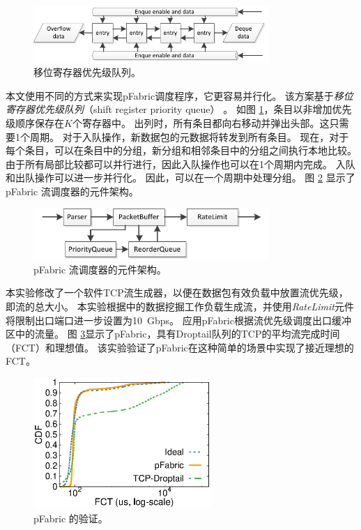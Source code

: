 \begin{figure}[htbp]
	\centering
	\includegraphics[width=0.8\textwidth]{image/PriorityQueue}
	\caption{移位寄存器优先级队列。}
	\label{clicknp:fig:ShiftRegPrioQueue}
\end{figure}


本文使用不同的方式来实现pFabric调度程序，它更容易并行化。
该方案基于\textit{移位寄存器优先级队列}（shift register priority queue） \cite {moon2000scalable}。
如图 \ref{clicknp:fig:ShiftRegPrioQueue}，条目以非增加优先级顺序保存在$K$个寄存器中。
出列时，所有条目都向右移动并弹出头部。这只需要1个周期。
对于入队操作，新数据包的元数据将转发到所有条目。
现在，对于每个条目，可以在条目中的分组，新分组和相邻条目中的分组之间执行本地比较。
由于所有局部比较都可以并行进行，因此入队操作也可以在1个周期内完成。
入队和出队操作可以进一步并行化。
因此，可以在一个周期中处理分组。
图 \ref{clicknp:fig:pfabric-arch} 显示了 pFabric 流调度器的元件架构。


\begin{figure}[htbp]
	\centering
	\includegraphics[width=0.8\textwidth]{image/PFabric}
	\caption{pFabric 流调度器的元件架构。}
	\label{clicknp:fig:pfabric-arch}
\end{figure}

本实验修改了一个软件TCP流生成器\cite {mqecn}，以便在数据包有效负载中放置流优先级，即流的总大小。
本实验根据\cite {pfabric}中的数据挖掘工作负载生成流，并使用\textit {RateLimit}元件将限制出口端口进一步设置为10~Gbps。
应用pFabric根据流优先级调度出口缓冲区中的流量。
图 \ref {clicknp:fig:pfabric}显示了pFabric，具有Droptail队列的TCP的平均流完成时间（FCT）和理想值。
该实验验证了pFabric在这种简单的场景中实现了接近理想的FCT。

\begin{figure}[htbp]
	\centering
	\includegraphics[width=0.6\textwidth]{eval/pfabric}
	\caption{pFabric 的验证。}
	\label{clicknp:fig:pfabric}
\end{figure}

